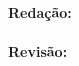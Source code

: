 \begin{adjustwidth}{0pt}{0.2\textwidth}
	\begin{flushleft}
		\textbf{Redação:}\\
		\equipaRedatora\\
		\bigskip
		\textbf{Revisão:}\\
		\equipaRevisora
	\end{flushleft}
\end{adjustwidth}